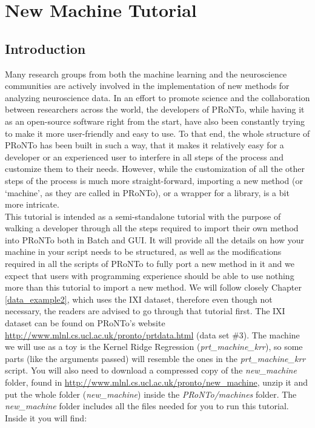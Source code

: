 \chapter{New Machine Tutorial}
\label{sec:new_machine_tutorial}
\minitoc

\section{Introduction}

Many research groups from both the machine learning and the neuroscience communities are actively involved in the implementation of new methods for analyzing neuroscience data. In an effort to promote science and the collaboration between researchers across the world, the developers of PRoNTo, while having it as an open-source software right from the start, have also been constantly trying to make it more user-friendly and easy to use. To that end, the whole structure of PRoNTo has been built in such a way, that it makes it relatively easy for a developer or an experienced user to interfere in all steps of the process and customize them to their needs. However, while the customization of all the other steps of the process is much more straight-forward, importing a new method (or `machine', as they are called in PRoNTo), or a wrapper for a library, is a bit more intricate.
\\

This tutorial is intended as a semi-standalone tutorial with the purpose of walking a developer through all the steps required to import their own method into PRoNTo both in Batch and GUI. It will provide all the details on how your machine in your script needs to be structured, as well as the modifications required in all the scripts of PRoNTo to fully port a new method in it and we expect that users with programming experience should be able to use nothing more than this tutorial to import a new method. We will follow closely Chapter \ref{data_example2}, which uses the IXI dataset, therefore even though not necessary, the readers are advised to go through that tutorial first. The IXI dataset can be found on PRoNTo's website \url{http://www.mlnl.cs.ucl.ac.uk/pronto/prtdata.html} (data set \#3). The machine we will use as a toy is the Kernel Ridge Regression (\textit{prt\_machine\_krr}), so some parts (like the arguments passed) will resemble the ones in the \textit{prt\_machine\_krr} script. You will also need to download a compressed copy of the \textit{new\_machine} folder, found in \url{http://www.mlnl.cs.ucl.ac.uk/pronto/new\_machine}, unzip it and put the whole folder (\textit{new\_machine}) inside the \textit{PRoNTo/machines} folder. The \textit{new\_machine} folder includes all the files needed for you to run this tutorial. Inside it you will find:

